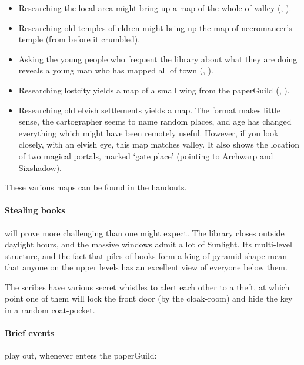 \begin{multicols}{2}
\begin{itemize}
  \item
  Researching the local area might bring up a map of the whole of \gls{valley} (, \tn[14]).
  \item
  Researching old temples of \gls{eldren} might bring up the map of \gls{necromancer}'s temple (from before it crumbled).
  \item
  Asking the young people who frequent the library about what they are doing reveals a young man who has mapped all of \gls{town} (, \tn[10]).
  \item
  Researching \gls{lostcity} yields a map of a small wing from the \gls{paperGuild} (, \tn[18]).
  \item
  Researching old elvish settlements yields a map.
  The format makes little sense, the cartographer seems to name random places, and age has changed everything which might have been remotely useful.
  However, if you look closely, with an elvish eye, this map matches \gls{valley}.
  It also shows the location of two magical portals, marked `gate place' (pointing to Archwarp and Sixshadow).
\end{itemize}

These various maps can be found in the handouts.

\paragraph{Stealing books}
will prove more challenging than one might expect.
The library closes outside daylight hours, and the massive windows admit a lot of Sunlight.
Its multi-level structure, and the fact that piles of books form a king of pyramid shape mean that anyone on the upper levels has an excellent view of everyone below them.

The \glspl{scribe} have various secret whistles to alert each other to a theft, at which point one of them will lock the front door (by the cloak-room) and hide the key in a random coat-pocket.

\paragraph{Brief events}
play out, whenever  enters the \gls{paperGuild}:


\end{multicols}
